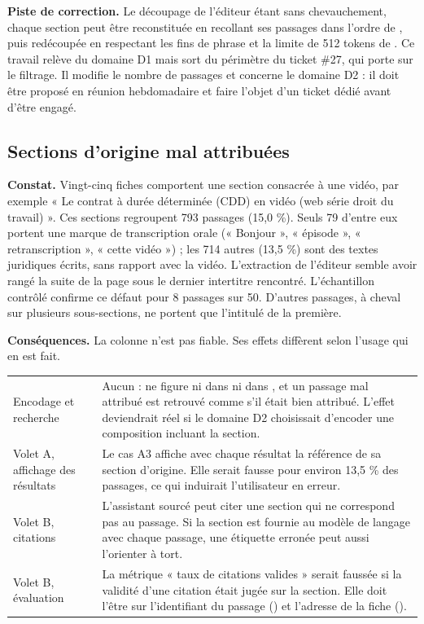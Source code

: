 \textbf{Piste de correction.} Le découpage de l'éditeur étant sans chevauchement, chaque section peut
être reconstituée en recollant ses passages dans l'ordre de , puis redécoupée en
respectant les fins de phrase et la limite de 512 tokens de . Ce travail
relève du domaine D1 mais sort du périmètre du ticket \#27, qui porte sur le filtrage. Il modifie le
nombre de passages et concerne le domaine D2 : il doit être proposé en réunion hebdomadaire et faire
l'objet d'un ticket dédié avant d'être engagé.

\subsection{Sections d'origine mal attribuées}

\textbf{Constat.} Vingt-cinq fiches comportent une section consacrée à une vidéo, par exemple
« Le contrat à durée déterminée (CDD) en vidéo (web série droit du travail) ». Ces sections regroupent
793 passages (15,0 \%). Seuls 79 d'entre eux portent une marque de transcription orale (« Bonjour »,
« épisode », « retranscription », « cette vidéo ») ; les 714 autres (13,5 \%) sont des textes juridiques
écrits, sans rapport avec la vidéo. L'extraction de l'éditeur semble avoir rangé la suite de la page sous
le dernier intertitre rencontré. L'échantillon contrôlé confirme ce défaut pour 8 passages sur 50.
D'autres passages, à cheval sur plusieurs sous-sections, ne portent que l'intitulé de la première.

\textbf{Conséquences.} La colonne  n'est pas fiable. Ses effets diffèrent selon l'usage
qui en est fait.

\begin{tabletype}
\begin{tabularx}{\textwidth}{@{}L{3.6cm}Y@{}}
\toprule
{} &  \\
\midrule
Encodage et recherche & Aucun :  ne figure ni dans  ni dans , et un passage mal attribué est retrouvé comme s'il était bien attribué. L'effet deviendrait réel si le domaine D2 choisissait d'encoder une composition incluant la section. \\
Volet A, affichage des résultats & Le cas A3 affiche avec chaque résultat la référence de sa section d'origine. Elle serait fausse pour environ 13,5 \% des passages, ce qui induirait l'utilisateur en erreur. \\
Volet B, citations & L'assistant sourcé peut citer une section qui ne correspond pas au passage. Si la section est fournie au modèle de langage avec chaque passage, une étiquette erronée peut aussi l'orienter à tort. \\
Volet B, évaluation & La métrique « taux de citations valides » serait faussée si la validité d'une citation était jugée sur la section. Elle doit l'être sur l'identifiant du passage () et l'adresse de la fiche (). \\
\bottomrule
\end{tabularx}
\end{tabletype}

